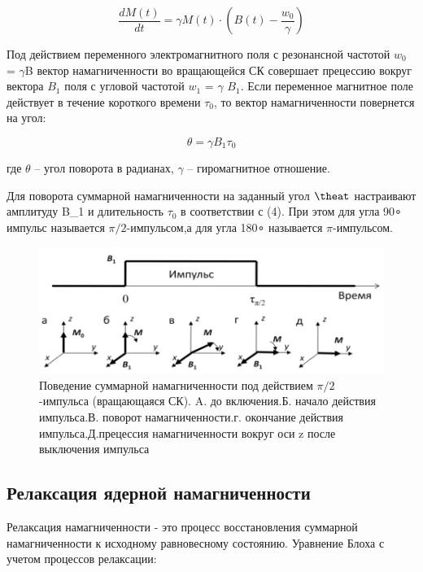 \documentclass{article}
\begin{document}
\begin{equation*}
    \frac{dM(t)}{dt} = \gamma M(t)\cdot ( B(t) - \frac{w_0}{\gamma})
\end{equation*}

Под действием переменного электромагнитного поля с резонансной частотой $w_0$ = $\gamma$B вектор намагниченности во вращающейся СК совершает прецессию вокруг вектора $B_1$ поля с угловой частотой $w_1$ = $\gamma$ $B_1$. Если переменное магнитное поле действует в течение короткого времени $\tau_0$, то вектор намагниченности повернется на угол:

\begin{equation*}
    \theta = \gamma B_1 \tau_0
\end{equation*}

где $\theta$ – угол поворота в радианах, $\gamma$ – гиромагнитное отношение.

Для поворота суммарной намагниченности на заданный угол $\theat$ настраивают амплитуду B_1 и длительность $\tau_0$ в соответствии с (4). При этом для угла 90∘ импульс называется $\pi/2$-импульсом,а для угла 180∘ называется $\pi$-импульсом.

\begin{figure}[h!]
    \centering
    \includegraphics[scale = 0.3]{п:2 импульс.png}
    \caption{Поведение суммарной намагниченности под действием $\pi/2$-импульса (вращающаяся СК). A. до включения.Б. начало действия импульса.В. поворот намагниченности.г. окончание действия импульса.Д.прецессия намагниченности вокруг оси z после выключения импульса}
    \label{fig0}
\end{figure}



\subsection{Релаксация ядерной намагниченности}
Релаксация намагниченности - это процесс восстановления суммарной намагниченности к исходному равновесному состоянию. Уравнение Блоха с учетом процессов релаксации:
\end{document}
